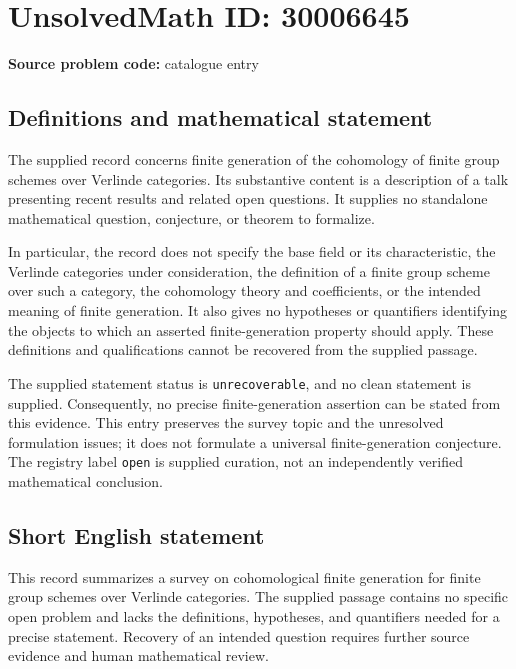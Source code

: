 \documentclass[11pt]{article}
\begin{document}
\section*{UnsolvedMath ID: 30006645}
\textbf{Source problem code:} catalogue entry
\subsection{Definitions and mathematical statement}
The supplied record concerns finite generation of the cohomology of finite group schemes over Verlinde categories. Its substantive content is a description of a talk presenting recent results and related open questions. It supplies no standalone mathematical question, conjecture, or theorem to formalize.

In particular, the record does not specify the base field or its characteristic, the Verlinde categories under consideration, the definition of a finite group scheme over such a category, the cohomology theory and coefficients, or the intended meaning of finite generation. It also gives no hypotheses or quantifiers identifying the objects to which an asserted finite-generation property should apply. These definitions and qualifications cannot be recovered from the supplied passage.

The supplied statement status is \texttt{unrecoverable}, and no clean statement is supplied. Consequently, no precise finite-generation assertion can be stated from this evidence. This entry preserves the survey topic and the unresolved formulation issues; it does not formulate a universal finite-generation conjecture. The registry label \texttt{open} is supplied curation, not an independently verified mathematical conclusion.
\subsection{Short English statement}
This record summarizes a survey on cohomological finite generation for finite group schemes over Verlinde categories. The supplied passage contains no specific open problem and lacks the definitions, hypotheses, and quantifiers needed for a precise statement. Recovery of an intended question requires further source evidence and human mathematical review.
\end{document}
